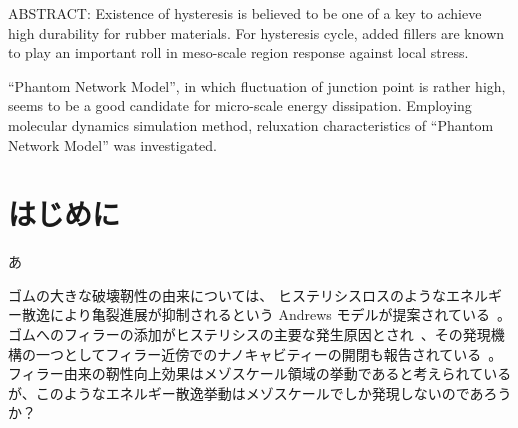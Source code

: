 \documentclass[uplatex,10pt,a4paper,twocolumn]{jsarticle}
\begin{document}


\begin{spacing}{0.95}
ABSTRACT: 
Existence of hysteresis is believed to be one of a key to achieve high durability for rubber materials.
For hysteresis cycle, added fillers are known to play an important roll in meso-scale region response against local stress.

``Phantom Network Model'', in which fluctuation of junction point is rather high, seems to be a good candidate for micro-scale energy dissipation.
Employing molecular dynamics simulation method, reluxation characteristics of ``Phantom Network Model'' was investigated.
\end{spacing}

\section{はじめに}
あ

ゴムの大きな破壊靭性の由来については、 ヒステリシスロスのようなエネルギー散逸により亀裂進展が抑制されるという Andrews モデルが提案されている~\cite{Andrews1977}。
ゴムへのフィラーの添加がヒステリシスの主要な発生原因とされ~\cite{Grosch1968}、その発現機構の一つとしてフィラー近傍でのナノキャビティーの開閉も報告されている~\cite{Zhang2013}。
フィラー由来の靭性向上効果はメゾスケール領域の挙動であると考えられているが、このようなエネルギー散逸挙動はメゾスケールでしか発現しないのであろうか？
\end{document}
